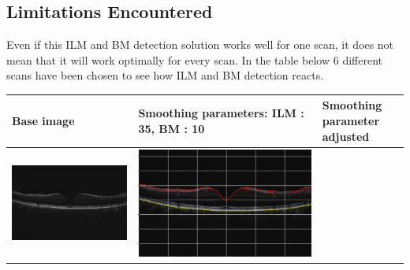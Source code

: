 \documentclass[12pt,a4paper]{scrartcl}
\begin{document}
\subsection{Limitations Encountered}
Even if this ILM and BM detection solution works well for one scan, it does not mean that it will work optimally for every scan. In the table below 6 different scans have been chosen to see how ILM and BM detection reacts.

\begin{table}[H]
  \centering
  \begin{tabular}{ | m{5cm} | m{5cm} | m{5cm} | }
    \hline
    Base image & Smoothing parameters: ILM : 35, BM : 10 & Smoothing parameter adjusted \\ 
    \hline%
    \begin{minipage}{.3\textwidth}
      \includegraphics[width=\linewidth]{./images/TableOCT/base1.jpeg}
    \end{minipage}
    &
     \begin{minipage}{.3\textwidth}
      \includegraphics[width=\linewidth]{./images/TableOCT/ILM_BM_1.png}

\end{minipage}
\end{tabular}
\end{table}
\end{document}
